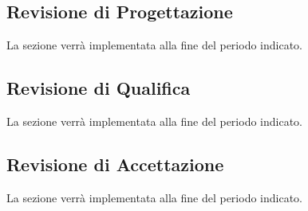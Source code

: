 \subsection{Revisione di Progettazione}
La sezione verrà implementata alla fine del periodo indicato.
\subsection{Revisione di Qualifica}
La sezione verrà implementata alla fine del periodo indicato.
\subsection{Revisione di Accettazione}
La sezione verrà implementata alla fine del periodo indicato.
